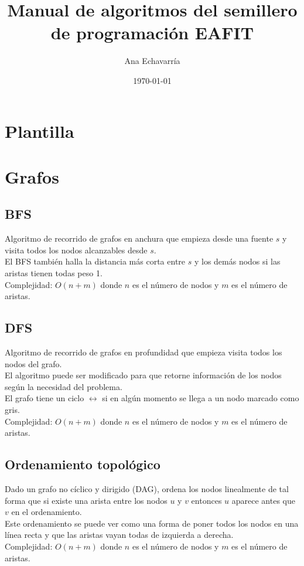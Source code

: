 \documentclass[10pt,letterpaper,twocolumn]{article}
\newcommand{\source}[1]{
	
	\dotfill
}
\begin{document}
\title{Manual de algoritmos del semillero de programación EAFIT}
\author{Ana Echavarría}
\date{\today}
\maketitle

\tableofcontents

\section{Plantilla}
	\source{./src/template.cpp}

\section{Grafos}

	\subsection{BFS}
		Algoritmo de recorrido de grafos en anchura que empieza desde una fuente $s$ y visita todos los nodos alcanzables desde $s$.\\
		El BFS también halla la distancia más corta entre $s$ y los demás nodos si las aristas tienen todas peso 1.\\
		Complejidad: $O(n+m)$ donde $n$ es el número de nodos y $m$ es el número de aristas.\\
		\source{./src/bfs.cpp}
		
	\subsection{DFS}
		Algoritmo de recorrido de grafos en profundidad que empieza visita todos los nodos del grafo.\\
		El algoritmo puede ser modificado para que retorne información de los nodos según la necesidad del problema.\\
		El grafo tiene un ciclo $\leftrightarrow$ si en algún momento se llega a un nodo marcado como gris.\\
		Complejidad: $O(n+m)$ donde $n$ es el número de nodos y $m$ es el número de aristas.\\
		\source{./src/dfs.cpp}
		
	\subsection{Ordenamiento topológico}
		Dado un grafo no cíclico y dirigido (DAG), ordena los nodos linealmente de tal forma que si existe una arista entre los nodos $u$ y $v$ entonces $u$ aparece antes que $v$ en el ordenamiento.\\
		Este ordenamiento se puede ver como una forma de poner todos los nodos en una línea recta y que las aristas vayan todas de izquierda a derecha.\\
		Complejidad: $O(n+m)$ donde $n$ es el número de nodos y $m$ es el número de aristas.\\
		\source{./src/ordenamiento_topologico.cpp}
		
\end{document}
